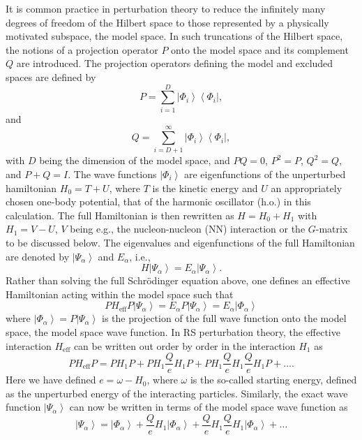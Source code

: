 It is common practice in perturbation theory to reduce the infinitely
many degrees of freedom of the Hilbert space to those represented
by a physically motivated subspace, the model space.
In such truncations of the Hilbert space, the notions of a projection
operator $P$ onto the model space and its complement $Q$ are
introduced. The projection operators defining the model and excluded
spaces are defined by
\begin{equation}
  P=\sum_{i=1}^{D} \left|\Phi_i\right\rangle
  \left\langle\Phi_i\right |,
\end{equation}
and
\begin{equation}
  Q=\sum_{i=D+1}^{\infty} \left|\Phi_i\right\rangle
  \left\langle\Phi_i\right |,
\end{equation}
with $D$ being the dimension of the model space, and $PQ=0$, $P^2 =P$,
$Q^2 =Q$, and $P+Q=I$. The wave functions $\left|\Phi_i\right\rangle$ 
are eigenfunctions
of the unperturbed hamiltonian $H_0 = T+U$, where $T$ is the kinetic
energy and $U$ an appropriately chosen one-body potential, that of the
harmonic oscillator (h.o.) in this calculation. The full Hamiltonian
is then rewritten as $H=H_0 +H_1$ with $H_1=V-U$, $V$ being e.g., the
nucleon-nucleon (NN) interaction or the $G$-matrix to be discussed below. 
The eigenvalues and eigenfunctions of the full Hamiltonian are denoted by
$\left|\Psi_{\alpha}\right\rangle$ and $E_{\alpha}$, i.e.,
\begin{equation}
  H\left|\Psi_{\alpha}\right\rangle= 
  E_{\alpha}\left|\Psi_{\alpha}\right\rangle.
\end{equation}
Rather than solving the full Schr\"{o}dinger equation above, one defines
an effective Hamiltonian acting within the model space such that
\begin{equation}
  PH_{\mathrm{eff}}P\left|\Psi_{\alpha}\right\rangle=
  E_{\alpha}P\left|\Psi_{\alpha}\right\rangle=
  E_{\alpha}\left|\Phi_{\alpha}\right\rangle
\end{equation}
where $\left|\Phi_{\alpha}\right\rangle=P\left|\Psi_{\alpha}\right\rangle$
is the projection of the full wave function
onto the model space, the model space wave function.
In RS perturbation theory, the effective interaction
$H_{\mathrm{eff}}$ can be written out order by order in the 
interaction $H_1$ as
\begin{equation}
  PH_{\mathrm{eff}}P=PH_1P +PH_1\frac{Q}{e}H_1 P+
  PH_1\frac{Q}{e}H_1 \frac{Q}{e}H_1 P+\dots.
  \label{eq:effint}
\end{equation}
Here we have defined $e=\omega -H_0$, 
where $\omega$ is the so-called starting energy, defined as the unperturbed
energy of the interacting particles. Similarly, the exact wave
function $\left|\Psi_{\alpha}\right\rangle$
can now be written in terms of the model space wave function as
\begin{equation}
  \left|\Psi_{\alpha}\right\rangle=
  \left|\Phi_{\alpha}\right\rangle+
  \frac{Q}{e}H_1\left|\Phi_{\alpha}\right\rangle
  +\frac{Q}{e}H_1\frac{Q}{e}H_1\left|\Phi_{\alpha}\right\rangle+\dots
  \label{eq:wavef}
\end{equation}

